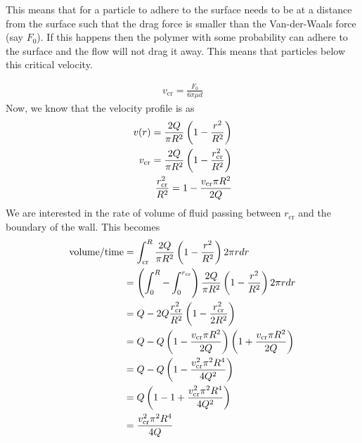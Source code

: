 This means that for a particle to adhere to the surface needs to be at a distance from the surface such that the drag force is smaller than the Van-der-Waals force (say $F_0$). If this happens then the polymer with some probability can adhere to the surface and the flow will not drag it away. This means that particles below this critical velocity.


\begin{align}
    v_\text{cr} = \frac{F_0}{6\pi \mu d}
\end{align}
%
Now, we know that the velocity profile is as 
%
\begin{align}
 v(r) = \frac{2Q}{\pi R^2} \left( 1 - \frac{r^2}{R^2}\right)   \\
 v_\text{cr} = \frac{2Q}{\pi R^2} \left( 1 - \frac{r_\text{cr}^2}{R^2}\right)   \\
 \frac{r_\text{cr}^2}{R^2} = 1 - \frac{v_\text{cr} \pi R^2}{2Q}
\end{align}
%
We are interested in the rate of volume of fluid passing between $r_\text{cr}$ and the boundary of the wall. This becomes
%
\begin{align}
    \text{volume}/\text{time} & = \int_{\text{cr}}^R \frac{2Q}{\pi R^2} \left( 1 - \frac{r^2}{R^2}\right) 2\pi r dr \\
    & = \left( \int_0^R - \int_0^{r_\text{cr}}\right) \frac{2Q}{\pi R^2} \left( 1 - \frac{r^2}{R^2}\right) 2\pi r dr \\
    & = Q - {2Q} \frac{r_\text{cr}^2}{R^2} \left( 1 - \frac{r_\text{cr}^2}{2R^2} \right) \\
    & = Q - {Q} \left( 1 - \frac{v_\text{cr} \pi R^2}{2Q} \right)  \left( 1 +  \frac{v_\text{cr} \pi R^2}{2Q}  \right) \\
    & = Q - {Q} \left( 1 - \frac{v^2_\text{cr} \pi^2 R^4}{4Q^2} \right) \\
    & = Q \left( 1-1+\frac{v^2_\text{cr} \pi^2 R^4}{4Q^2} \right) \\
    & = \frac{v^2_\text{cr} \pi^2 R^4}{4Q}
\end{align}
%


